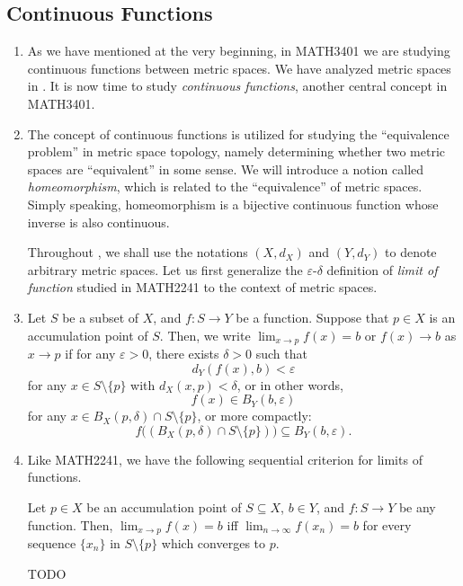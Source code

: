 \subsection{Continuous Functions}
\label{subsect:cts-fun}
\begin{enumerate}
\item As we have mentioned at the very beginning, in MATH3401 we are studying
continuous functions between metric spaces. We have analyzed metric spaces in
. It is now time to study \emph{continuous functions},
another central concept in MATH3401.

\item The concept of continuous functions is utilized for studying the
``equivalence problem'' in metric space topology, namely determining whether
two metric spaces are ``equivalent'' in some sense. We will introduce a notion
called \emph{homeomorphism}, which is related to the ``equivalence'' of metric
spaces. Simply speaking, homeomorphism is a bijective continuous function whose
inverse is also continuous.

Throughout , we shall use the notations \((X,d_{X})\) and
\((Y,d_Y)\) to denote arbitrary metric spaces. Let us first generalize the
\(\varepsilon\)-\(\delta\) definition of \emph{limit of function} studied in
MATH2241 to the context of metric spaces.

\item Let \(S\) be a subset of \(X\), and \(f:S\to Y\) be a function. Suppose
that \(p\in X\) is an accumulation point of \(S\). Then, we write
\(\displaystyle \lim_{x\to p}f(x)=b\) or \(f(x)\to b\) as \(x\to p\) if for any
\(\varepsilon>0\), there exists \(\delta>0\) such that
\[
d_Y(f(x),b)<\varepsilon
\]
for any \(x\in S\setminus\{p\}\) with \(d_X(x,p)<\delta\), or in other words,
\[
f(x)\in B_Y(b,\varepsilon)
\]
for any \(x\in B_X(p,\delta)\cap S\setminus \{p\}\), or more compactly:
\[
f\big((B_X(p,\delta)\cap S\setminus \{p\})\big)\subseteq B_Y(b,\varepsilon).
\]
\item Like MATH2241, we have the following sequential criterion for limits of
functions.
\begin{proposition}
\label{prp:lim-seq-crit}
Let \(p\in X\) be an accumulation point of \(S\subseteq X\), \(b\in Y\), and
\(f:S\to Y\) be any function. Then, \(\displaystyle \lim_{x\to p}f(x)=b\) iff
\(\displaystyle \lim_{n\to \infty}f(x_n)=b\) for every sequence \(\{x_n\}\) in
\(S\setminus\{p\}\) which converges to \(p\).
\end{proposition}
\begin{pf}
TODO
\end{pf}


\end{enumerate}
